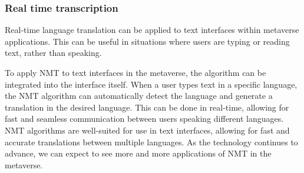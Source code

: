 \subsubsection{Real time transcription}
Real-time language translation can be applied to text interfaces within metaverse applications. This can be useful in situations where users are typing or reading text, rather than speaking.\par
To apply NMT to text interfaces in the metaverse, the algorithm can be integrated into the interface itself. When a user types text in a specific language, the NMT algorithm can automatically detect the language and generate a translation in the desired language. This can be done in real-time, allowing for fast and seamless communication between users speaking different languages. NMT algorithms are well-suited for use in text interfaces, allowing for fast and accurate translations between multiple languages. As the technology continues to advance, we can expect to see more and more applications of NMT in the metaverse.
